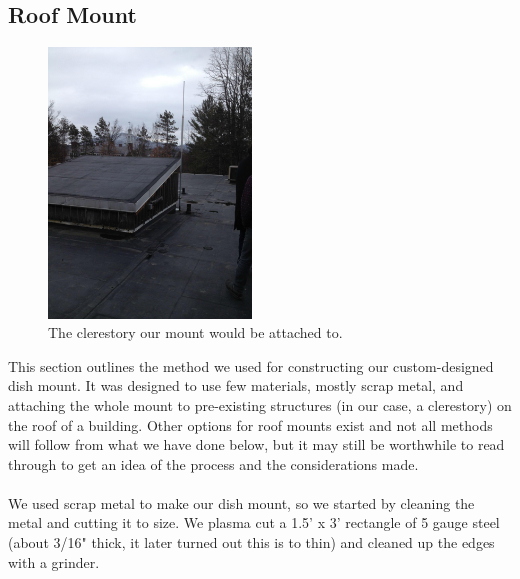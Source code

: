 \documentclass[11pt]{article} %
\begin{document}

\subsection{Roof Mount}


\begin{figure}
  \begin{center}
    \includegraphics[width=0.48\textwidth]{roofmount/00.jpeg}
  \end{center}
  \caption{The clerestory our mount would be attached to.}
\end{figure}

This section outlines the method we used for constructing our custom-designed dish mount. It was designed to use few materials, mostly scrap metal, and attaching the whole mount to pre-existing structures (in our case, a clerestory) on the roof of a building. Other options for roof mounts exist and not all methods will follow from what we have done below, but it may still be worthwhile to read through to get an idea of the process and the considerations made.
\\ \\
We used scrap metal to make our dish mount, so we started by cleaning the metal and cutting it to size. We plasma cut a 1.5' x 3' rectangle of 5 gauge steel (about 3/16" thick, it later turned out this is to thin) and cleaned up the edges with a grinder.



\end{document}
